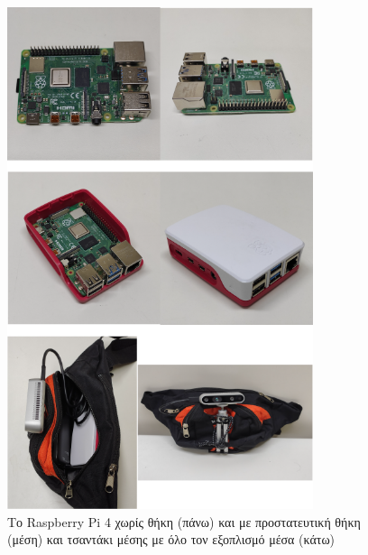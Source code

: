 \begin{figure}[H]
    \centering
    \includegraphics[width=0.8\textwidth]{images/equipment2.png}
    \caption{Το Raspberry Pi 4 χωρίς θήκη (πάνω) και με προστατευτική θήκη (μέση) και τσαντάκι μέσης με όλο τον εξοπλισμό μέσα (κάτω)}
    \label{fig:equipment2}
\end{figure}